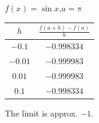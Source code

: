 {$\displaystyle f(x) =\sin x$,\quad $a=\pi$}
{\begin{tabular}{cc}
$h$ & $\frac{f(a+h)-f(a)}{h}$ \\ \hline 
 $ -0.1$ & $-0.998334$ \\
 $-0.01$ & $-0.999983$ \\
 $0.01$ & $-0.999983$ \\
 $0.1$ & $-0.998334$
\end{tabular}

The limit is approx. $-1$.
}
